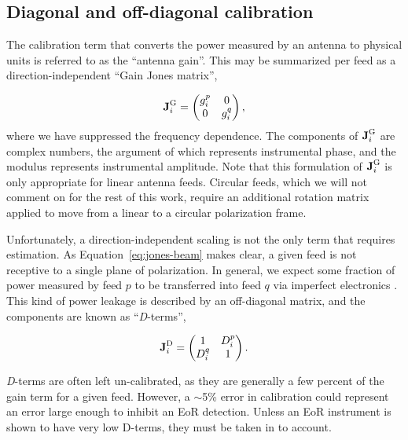 \subsection{Diagonal and off-diagonal calibration}

The calibration term that converts the power measured by an antenna to physical units is referred to as the ``antenna gain''. This may be summarized per feed as a direction-independent ``Gain Jones matrix'',

\begin{equation}
\textbf{J}_i^{\rm G} = 
\begin{pmatrix}
g_i^p &0 \\
0 & g_i^q\\
\end{pmatrix},
\label{eq:jones-gains}
\end{equation}
where we have suppressed the frequency dependence. The components of $\textbf{J}_i^{\rm G}$ are complex numbers, the argument of which represents instrumental phase, and the modulus represents instrumental amplitude. Note that this formulation of $\textbf{J}_i^{\rm G}$ is only appropriate for linear antenna feeds. Circular feeds, which we will not comment on for the rest of this work, require an additional rotation matrix applied to move from a linear to a circular polarization frame.

Unfortunately, a direction-independent scaling is not the only term that requires estimation. As Equation~\ref{eq:jones-beam} makes clear, a given feed is not receptive to a single plane of polarization. In general, we expect some fraction of power measured by feed $p$ to be transferred into feed $q$ via imperfect electronics \citep[clever feed designs can attempt to minimize this effect, e.g.][]{Parashare.06, Parsons.10}. This kind of power leakage is described by an off-diagonal matrix, and the components are known as ``\textit{D}-terms'',

\begin{equation}
\textbf{J}_i^{\rm D} = 
\begin{pmatrix}
1 & D_i^p \\
D_i^q & 1\\
\end{pmatrix}.
\end{equation}

\textit{D}-terms are often left un-calibrated, as they are generally a few percent of the gain term for a given feed. However, a $\sim$5\% error in calibration could represent an error large enough to inhibit an EoR detection. Unless an EoR instrument is shown to have very low D-terms, they must be taken in to account.

